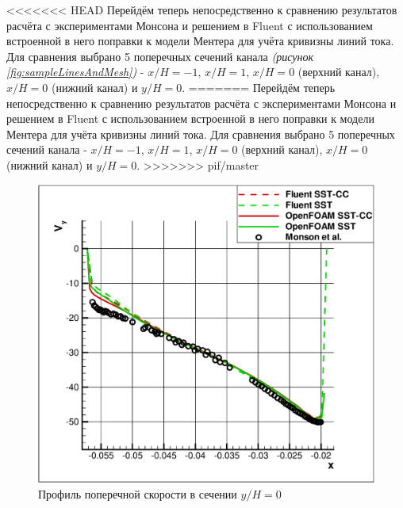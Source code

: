 <<<<<<< HEAD
Перейдём теперь непосредственно к сравнению результатов расчёта с экспериментами Монсона и решением в Fluent с использованием встроенной в него поправки к модели Ментера для учёта кривизны линий тока. Для сравнения выбрано 5 поперечных сечений канала \textit{(рисунок \ref{fig:sampleLinesAndMesh})} - $x/H=-1$, $x/H = 1$, $x/H = 0$ (верхний канал), $x/H = 0$ (нижний канал) и $y/H=0$.
=======
Перейдём теперь непосредственно к сравнению результатов расчёта с экспериментами Монсона и решением в Fluent с использованием встроенной в него поправки к модели Ментера для учёта кривизны линий тока. Для сравнения выбрано 5 поперечных сечений канала - $x/H=-1$, $x/H = 1$, $x/H = 0$ (верхний канал), $x/H = 0$ (нижний канал) и $y/H=0$.
>>>>>>> pif/master
\begin{figure}[h]
	\centering
	\includegraphics[scale=0.55]{yh0}
	\caption{Профиль поперечной скорости в сечении $y/H=0$}
	\label{fig:y0}
\end{figure}
